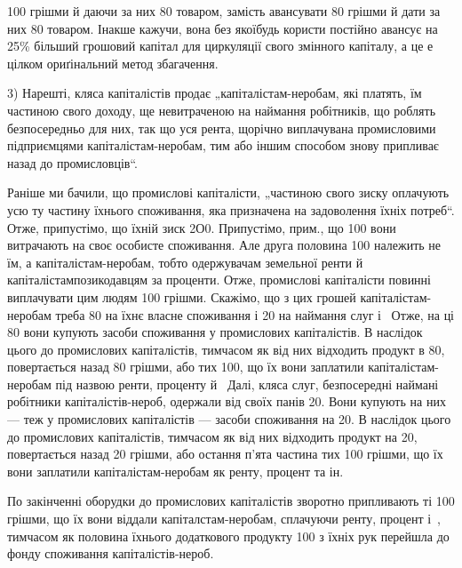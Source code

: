 \parcont{}  %
100 грішми й даючи за них 80 товаром, замість авансувати 80 грішми й
дати за них 80 товаром. Інакше кажучи, вона без якоїбудь користи постійно авансує на 25\%
більший грошовий капітал для циркуляції свого змінного капіталу, а це е цілком ориґінальний метод
збагачення.

3) Нарешті, кляса капіталістів продає „капіталістам-неробам, які платять, їм частиною свого доходу,
ще невитраченою на наймання робітників, що роблять безпосередньо для них, так що уся рента, щорічно
виплачувана промисловими підприємцями капіталістам-неробам, тим або іншим способом знову припливає
назад до промисловців“.

Раніше ми бачили, що промислові капіталісти, „частиною свого зиску оплачують усю ту частину їхнього
споживання, яка призначена на задоволення їхніх потреб“. Отже, припустімо, що їхній зиск \deq{} 2О0. Припустімо, прим., що 100 вони витрачають на своє особисте споживання. Але друга
половина \deq{} 100 належить не їм, а капіталістам-неробам, тобто одержувачам земельної ренти й
капіталістампозикодавцям
за проценти. Отже, промислові капіталісти повинні виплачувати цим людям 100 грішми.
Скажімо, що з цих грошей капіталістам-неробам треба 80 на їхнє власне споживання і 20 на наймання слуг і~ Отже, на ці 80 вони купують засоби споживання у
промислових капіталістів. В наслідок цього до промислових капіталістів, тимчасом як від них
відходить продукт в 80, повертається назад 80 грішми, або  тих 100,
що їх вони заплатили капіталістам-неробам під назвою ренти, проценту й~ Далі, кляса слуг,
безпосередні наймані робітники капіталістів-нероб, одержали від своїх панів 20. Вони
купують на них — теж у промислових капіталістів — засоби споживання на 20. В наслідок цього
до промислових капіталістів, тимчасом як від них відходить продукт на 20, повертається
назад 20 грішми, або остання п’ята частина тих 100 грішми, що їх вони заплатили
капіталістам-неробам як ренту, процент та ін.

По закінченні оборудки до промислових капіталістів зворотно припливають ті 100 грішми, що
їх вони віддали капіталстам-неробам, сплачуючи ренту, процент і~, тимчасом як половина їхнього
додаткового продукту \deq{} 100 з їхніх рук перейшла до фонду споживання капіталістів-нероб.

